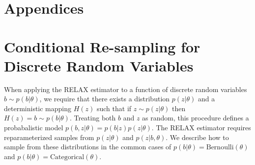 \documentclass{article}
\begin{document}














\clearpage
\section*{Appendices}
\appendix

\section{Conditional Re-sampling for Discrete Random Variables}
\label{resample}
When applying the RELAX estimator to a function of discrete random variables $b \sim p(b|\theta)$, we require that there exists a distribution $p(z|\theta)$ and a deterministic mapping $H(z)$ such that if $z \sim p(z|\theta)$ then $H(z) = b \sim p(b|\theta)$. Treating both $b$ and $z$ as random, this procedure defines a probabalistic model $p(b, z | \theta) = p(b|z)p(z|\theta)$. The RELAX estimator requires reparameterized samples from $p(z|\theta)$ and $p(z|b,\theta)$. We describe how to sample from these distributions in the common cases of $p(b|\theta) = \text{Bernoulli}(\theta)$ and $p(b|\theta) = \text{Categorical}(\theta)$.
\end{document}
